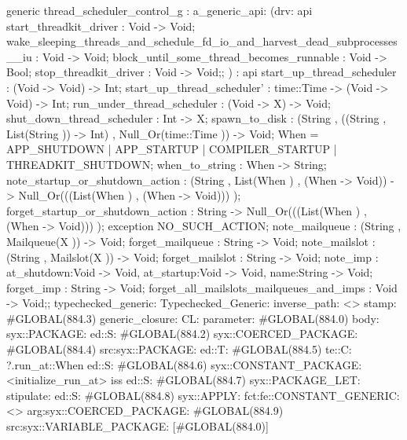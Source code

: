 generic thread_scheduler_control_g
:
a_generic_api:
(drv:
api {
    start_threadkit_driver : Void -> Void;
    wake_sleeping_threads_and_schedule_fd_io_and_harvest_dead_subprocesses__iu : Void -> Void;
    block_until_some_thread_becomes_runnable : Void -> Bool;
    stop_threadkit_driver : Void -> Void;};
)
:
api {
    start_up_thread_scheduler : (Void -> Void) -> Int;
    start_up_thread_scheduler' : time::Time -> (Void -> Void) -> Int;
    run_under_thread_scheduler : (Void -> X) -> Void;
    shut_down_thread_scheduler : Int -> X;
    spawn_to_disk : (String , ((String , List(String )) -> Int) , Null_Or(time::Time )) -> Void;
    When  = APP_SHUTDOWN | APP_STARTUP | COMPILER_STARTUP | THREADKIT_SHUTDOWN;
    when_to_string : When -> String;
        note_startup_or_shutdown_action :
        (String , List(When ) , (When -> Void)) -> Null_Or(((List(When ) , (When -> Void))) );
    forget_startup_or_shutdown_action : String -> Null_Or(((List(When ) , (When -> Void))) );
    exception NO_SUCH_ACTION;
    note_mailqueue : (String , Mailqueue(X )) -> Void;
    forget_mailqueue : String -> Void;
    note_mailslot : (String , Mailslot(X )) -> Void;
    forget_mailslot : String -> Void;
    note_imp : {at_shutdown:Void -> Void, at_startup:Void -> Void, name:String} -> Void;
    forget_imp : String -> Void;
    forget_all_mailslots_mailqueues_and_imps : Void -> Void;};
typechecked_generic:
Typechecked_Generic:
inverse_path: <>
stamp: #GLOBAL(884.3)
generic_closure:
CL:
parameter: #GLOBAL(884.0)
body: syx::PACKAGE:
        ed::S: #GLOBAL(884.2)
            syx::COERCED_PACKAGE:
                #GLOBAL(884.4)
                 src:syx::PACKAGE:
                        ed::T: #GLOBAL(884.5)
                         te::C:
                         ?.run_at::When
                                ed::S: #GLOBAL(884.6) syx::CONSTANT_PACKAGE: <initialize_run_at> iss
                                    ed::S: #GLOBAL(884.7)
                                        syx::PACKAGE_LET:
                                            stipulate:  ed::S: #GLOBAL(884.8)
                                                            syx::APPLY:
                                                                fct:fe::CONSTANT_GENERIC:<>
                                                                arg:syx::COERCED_PACKAGE:
                                                                        #GLOBAL(884.9)
                                                                         src:syx::VARIABLE_PACKAGE:
                                                                         [#GLOBAL(884.0)]
